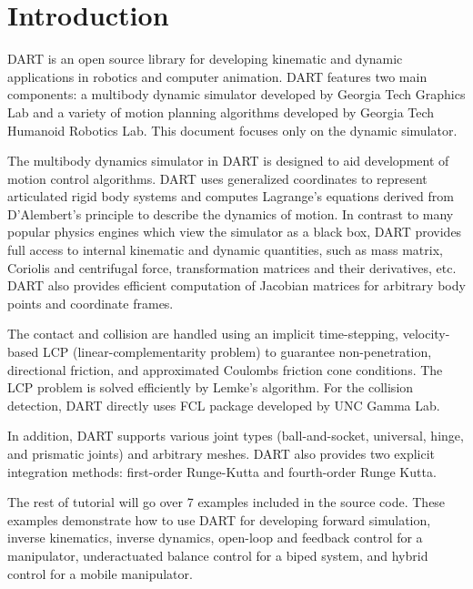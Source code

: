 \section{Introduction}
DART is an open source library for developing kinematic and dynamic
applications in robotics and computer animation. DART features two
main components: a multibody dynamic simulator developed by Georgia
Tech Graphics Lab and a variety of motion planning algorithms
developed by Georgia Tech Humanoid Robotics Lab. This document focuses
only on the dynamic simulator.
 
The multibody dynamics simulator in DART is designed to aid
development of motion control algorithms. DART uses generalized
coordinates to represent articulated rigid body systems and computes
Lagrange’s equations derived from D’Alembert’s principle to describe
the dynamics of motion. In contrast to many popular physics engines
which view the simulator as a black box, DART provides full access to
internal kinematic and dynamic quantities, such as mass matrix,
Coriolis and centrifugal force, transformation matrices and their
derivatives, etc. DART also provides efficient computation of Jacobian
matrices for arbitrary body points and coordinate frames.

The contact and collision are handled using an implicit time-stepping,
velocity-based LCP (linear-complementarity problem) to guarantee
non-penetration, directional friction, and approximated Coulombs
friction cone conditions. The LCP problem is solved efficiently by
Lemke's algorithm. For the collision detection, DART directly uses FCL
package developed by UNC Gamma Lab.

In addition, DART supports various joint types (ball-and-socket,
universal, hinge, and prismatic joints) and arbitrary meshes. DART
also provides two explicit integration methods: first-order
Runge-Kutta and fourth-order Runge Kutta.

The rest of tutorial will go over 7 examples included in the source
code. These examples demonstrate how to use DART for developing
forward simulation, inverse kinematics, inverse dynamics, open-loop
and feedback control for a manipulator, underactuated balance control
for a biped system, and hybrid control for a mobile manipulator.
